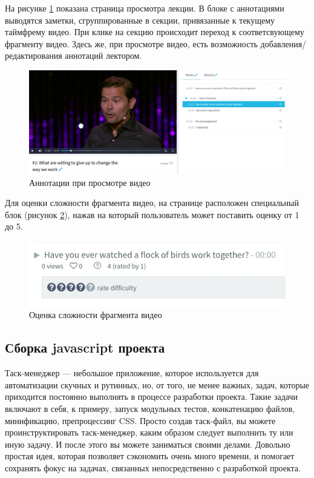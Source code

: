 На рисунке \ref{annotations} показана страница просмотра лекции. В блоке с аннотациями
выводятся заметки, сгруппированные в секции, привязанные к текущему таймфрему видео.
При клике на секцию происходит переход к соответсвующему фрагменту видео.
Здесь же, при просмотре видео, есть возможность добавления/редактирования аннотаций лектором.

\begin{figure}[H]
  \centering
  \includegraphics[width=1\textwidth]{images/annotations.jpg}
  \caption{Аннотации при просмотре видео}\label{annotations}
\end{figure}

Для оценки сложности фрагмента видео, на странице расположен специальный блок
(рисунок \ref{difficulty}), нажав
на который пользователь может поставить оценку от 1 до 5.

\begin{figure}[H]
  \centering
  \includegraphics[width=1\textwidth]{images/difficulty.jpg}
  \caption{Оценка сложности фрагмента видео}\label{difficulty}
\end{figure}

\subsection{Сборка javascript проекта}

Таск-менеджер — небольшое приложение, которое используется для автоматизации
скучных и рутинных, но, от того, не менее важных, задач, которые приходится постоянно
выполнять в процессе разработки проекта. Такие задачи включают в себя, к примеру,
запуск модульных тестов, конкатенацию файлов, минификацию, препроцессинг CSS.
Просто создав таск-файл, вы можете проинструктировать таск-менеджер, каким образом
следует выполнить ту или иную задачу. И после этого вы можете заниматься своими делами.
Довольно простая идея, которая позволяет сэкономить очень много времени, и помогает
сохранять фокус на задачах, связанных непосредственно с разработкой проекта.

